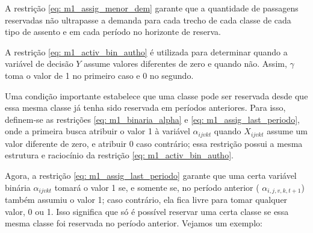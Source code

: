A restrição \ref{eq: m1_assig_menor_dem} garante que a quantidade de passagens reservadas não ultrapasse a demanda para cada trecho de cada classe de cada tipo de assento e em cada período no horizonte de reserva.

A restrição  \ref{eq: m1_activ_bin_autho} é utilizada para determinar quando a variável de decisão $Y$ assume valores diferentes de zero e quando não. Assim, $\gamma $ toma o valor de 1 no primeiro caso e 0 no segundo.

Uma condição importante estabelece que uma classe pode ser reservada desde que essa mesma classe já tenha sido reservada em períodos anteriores. Para isso, definem-se as restrições \ref{eq: m1_binaria_alpha} e \ref{eq: m1_assig_last_periodo}, onde a primeira busca atribuir o valor 1 à variável $\alpha_{ijvkt}$ quando $X_{ijvkt}$ assume um valor diferente de zero, e atribuir 0 caso contrário; essa restrição possui a mesma estrutura e raciocínio da restrição \ref{eq: m1_activ_bin_autho}.

Agora, a restrição \ref{eq: m1_assig_last_periodo} garante que uma certa variável binária $\alpha_{ijvkt}$ tomará o valor 1 se, e somente se, no período anterior ( $\alpha_{i,j,v,k,t+1}$) também assumiu o valor 1; caso contrário, ela fica livre para tomar qualquer valor, 0 ou 1. Isso significa que só é possível reservar uma certa classe se essa mesma classe foi reservada no período anterior. Vejamos um exemplo:


